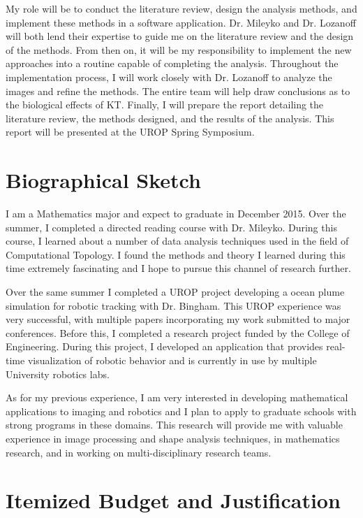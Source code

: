 \documentclass[ letterpaper, 12 pt, conference]{ieeeconf}  %
\begin{document}
My role will be to conduct the literature review, design the analysis methods, and implement these methods in a software application.  Dr. Mileyko and Dr. Lozanoff will both lend their expertise to guide me on the literature review and the design of the methods.  From then on, it will be my responsibility to implement the new approaches into a routine capable of completing the analysis.   Throughout the implementation process, I will work closely with Dr. Lozanoff to analyze the images and refine the methods.  The entire team will help draw conclusions as to the biological effects of \ac{KT}. Finally, I will prepare the report detailing the literature review, the methods designed, and the results of the analysis.  This report will be presented at the UROP Spring Symposium.  %

\section{Biographical Sketch}

I am a Mathematics major and expect to graduate in December 2015. Over the summer, I completed a directed reading course with Dr. Mileyko.  During this course, I learned about a number of data analysis techniques used in the field of Computational Topology.  I found the methods and theory I learned during this time extremely fascinating and I hope to pursue this channel of research further.

Over the same summer I completed a UROP project developing a ocean plume simulation for robotic tracking with Dr. Bingham.  This UROP experience was very successful, with multiple papers incorporating my work submitted to major conferences. Before this, I completed a research project funded by the College of Engineering.  During this project, I developed an application that provides real-time visualization of robotic behavior and is currently in use by multiple University robotics labs. 

As for my previous experience, I am very interested in developing mathematical applications to imaging and robotics and I plan to apply to graduate schools with strong programs in these domains.  This research will provide me with valuable experience in image processing and shape analysis techniques, in mathematics research, and in working on multi-disciplinary research teams. 

\section{Itemized Budget and Justification}
\end{document}
